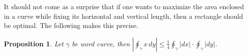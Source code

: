 \documentclass[11pt]{amsart}
\newtheorem{proposition}[theorem]{Proposition}
\theoremstyle{remark}
\newcommand{\Oint}{\displaystyle\oint}
\newcommand{\chris}[1]{\textcolor{purple}{[Chris] #1}}
\begin{document}


It should not come as a surprise that if one wants to maximize the area enclosed in a curve while fixing its horizontal and vertical length, then a rectangle should be optimal.  The following makes this precise.

\begin{proposition}\label{prop: 
Relate area with x- and-y length}
Let $\gamma$ be word curve, %
then 
 $\left\lvert\displaystyle\oint_{\gamma} x\, dy\right\rvert\leq\frac{1}{4}\Oint_{\gamma}|dx|\cdot \Oint_{\gamma}|dy|$.
\end{proposition}
\end{document}
